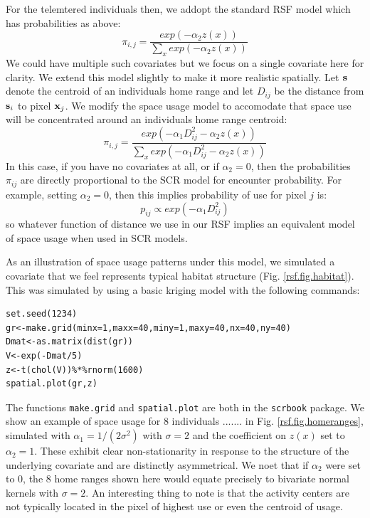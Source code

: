 For the telemtered individuals then, 
we addopt the standard RSF
model  which has probabilities as above:
\[
 \pi_{i,j} = \frac{ exp( -\alpha_{2} z(x) ) }{ \sum_{x} exp(-\alpha_{2} z(x))} 
\]
We could have multiple such covariates but we focus on a
single covariate here for clarity.  We extend this model slightly to
make it more realistic spatially. Let ${\bf s}$ denote the centroid of
an individuals home range and let $D_{ij}$ be the distance from ${\bf
  s}_{i}$ to pixel ${\bf x}_{j}$. We modify the space usage model to
accomodate that space use will be concentrated 
around an individuals home range centroid:
\[
 \pi_{i,j} = \frac{ exp( -\alpha_{1} D_{ij}^{2} -\alpha_{2} z(x) ) }
{ \sum_{x} exp(-\alpha_{1} D_{ij}^{2} -\alpha_{2} z(x))} 
\]
In this case, if you have no covariates at all, or if $\alpha_{2} =
0$, then 
the probabilities $\pi_{ij}$ are directly proportional to the SCR
model for encounter probability.
For example, setting $\alpha_{2} = 0$, then this implies probability
of use for pixel $j$ is:
\[
p_{ij} \propto  exp( -\alpha_{1} D_{ij}^{2})
\]
so whatever function of distance we use in our RSF implies an
equivalent model of space usage when used in SCR models. 

As an illustration of space usage patterns under this model, we
simulated a covariate that we feel represents typical habitat
structure (Fig. \ref{rsf.fig.habitat}). This was simulated by using a
basic kriging model with the following commands:
\begin{verbatim}
set.seed(1234)
gr<-make.grid(minx=1,maxx=40,miny=1,maxy=40,nx=40,ny=40)
Dmat<-as.matrix(dist(gr))
V<-exp(-Dmat/5)
z<-t(chol(V))%*%rnorm(1600)
spatial.plot(gr,z)
\end{verbatim}
The functions \mbox{\tt make.grid} and \mbox{\tt spatial.plot} are
both in the \mbox{\tt scrbook} package.
We show an example of space usage for 8 individuals ....... in
Fig. \ref{rsf.fig.homeranges},
simulated with $\alpha_{1} = 1/(2\sigma^2)$ with $\sigma = 2$ and the
coefficient on $z(x)$ set to $\alpha_{2} = 1$. 
These exhibit clear non-stationarity in
response to the structure of the underlying covariate 
and are distinctly asymmetrical.  We noet that if $\alpha_{2}$ were
set to 0, the 8 home ranges shown here would equate precisely to
bivariate normal kernels with $\sigma = 2$. 
An interesting thing to note is that the activity centers are not
typically located in the pixel of highest use or even the centroid of
usage. 

